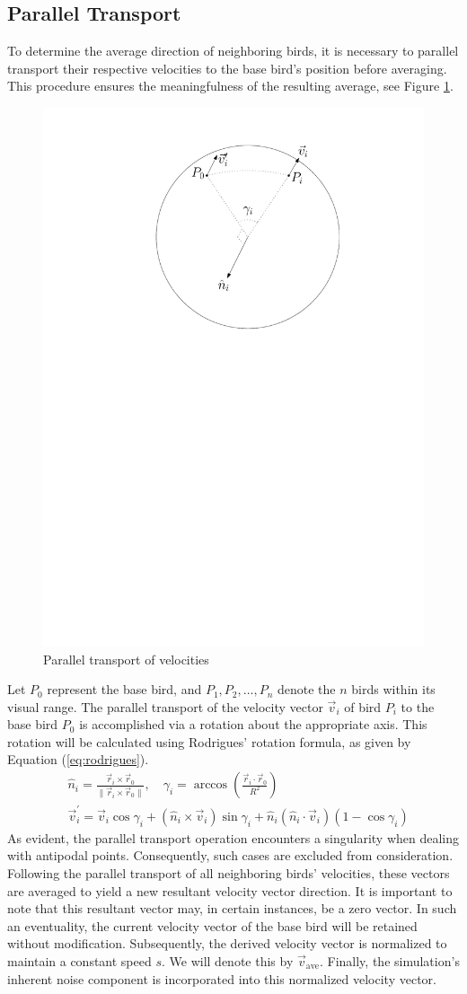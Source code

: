 \documentclass[12pt,a4paper]{article}
\begin{document}
\subsection{Parallel Transport}
To determine the average direction of neighboring birds, it is necessary to parallel transport their respective velocities to the base bird's position before averaging. This procedure ensures the meaningfulness of the resulting average, see Figure \ref{fig:parallel_transport}.
\begin{figure}[H]
    \centering
    \includegraphics[width=0.3\linewidth]{Figures/parallel}
    \caption{Parallel transport of velocities}
    \label{fig:parallel_transport}
\end{figure}

Let \(P_0\) represent the base bird, and \(P_1, P_2, \ldots, P_n\) denote the \(n\) birds within its visual range. The parallel transport of the velocity vector \(\vec{v}_i\) of bird \(P_i\) to the base bird \(P_0\) is accomplished via a rotation about the appropriate axis. This rotation will be calculated using Rodrigues' rotation formula, as given by Equation (\ref{eq:rodrigues}).
\begin{align}
& \hat{n}_i = \frac{\vec{r}_i \times \vec{r}_0}{\|\vec{r}_i \times \vec{r}_0\|}, \quad \gamma_i = \arccos\left( \frac{\vec{r}_i \cdot \vec{r}_0}{R^2}\right) \\
\label{eq:rodrigues}
& \vec{v}_{i}^\prime = \vec{v}_i \cos\gamma_i + (\hat{n}_i \times \vec{v}_i) \sin\gamma_i + \hat{n}_i (\hat{n}_i \cdot \vec{v}_i) (1 - \cos\gamma_i)
\end{align}
As evident, the parallel transport operation encounters a singularity when dealing with antipodal points. Consequently, such cases are excluded from consideration. Following the parallel transport of all neighboring birds' velocities, these vectors are averaged to yield a new resultant velocity vector direction. It is important to note that this resultant vector may, in certain instances, be a zero vector. In such an eventuality, the current velocity vector of the base bird will be retained without modification. Subsequently, the derived velocity vector is normalized to maintain a constant speed \(s\). We will denote this by \(\vec{v}_{\text{ave}}\). Finally, the simulation's inherent noise component is incorporated into this normalized velocity vector.
\end{document}
